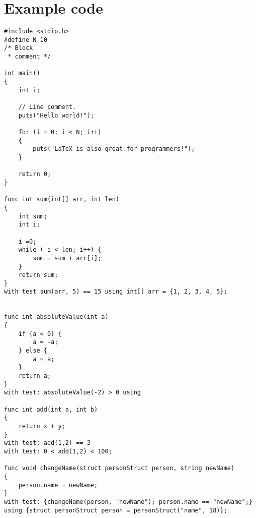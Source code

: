 \documentclass{article}
\begin{document}
\section{Example code}
\begin{lstlisting}
#include <stdio.h>
#define N 10
/* Block
 * comment */

int main()
{
    int i;

    // Line comment.
    puts("Hello world!");
    
    for (i = 0; i < N; i++)
    {
        puts("LaTeX is also great for programmers!");
    }

    return 0;
}

func int sum(int[] arr, int len)
{
	int sum;
	int i;
	
	i =0;
	while ( i < len; i++) {
		sum = sum + arr[i];
	}
	return sum;
}
with test sum(arr, 5) == 15 using int[] arr = {1, 2, 3, 4, 5};


func int absoluteValue(int a)
{
	if (a < 0) {
		a = -a;
	} else {
		a = a;
	}
	return a;
}
with test: absoluteValue(-2) > 0 using 

func int add(int a, int b)
{
	return x + y;
}
with test: add(1,2) == 3
with test: 0 < add(1,2) < 100;

func void changeName(struct personStruct person, string newName)
{
	person.name = newName;
}
with test: {changeName(person, "newName"); person.name == "newName";} using {struct personStruct person = personStruct("name", 18)};

\end{lstlisting}
\end{document}
